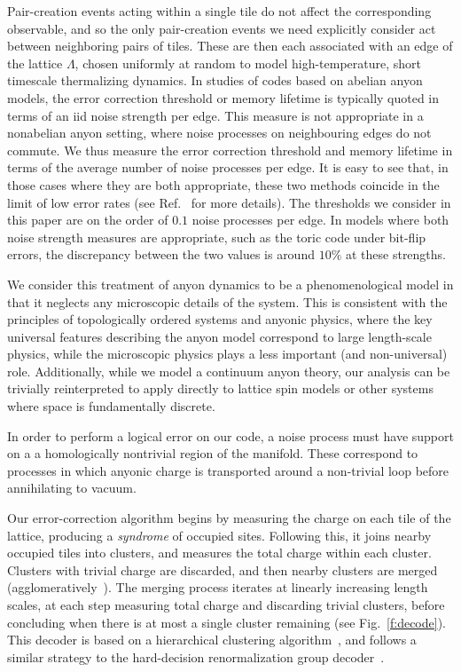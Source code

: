 \documentclass[aps, prl, letterpaper, twocolumn, superscriptaddress, notitlepage, 10pt]{revtex4-1}
\newcommand{\Fref}[1]{Fig.~\ref{#1}}
\begin{document}
Pair-creation events acting within a single tile do not affect the corresponding observable, and so the only pair-creation events we need explicitly consider act between neighboring pairs of tiles. These are then each associated with an edge of the lattice $\Lambda$, chosen 
uniformly at random to model high-temperature, short timescale thermalizing dynamics.
In studies of codes based on abelian anyon models, the error correction threshold or memory lifetime is typically quoted in terms of an iid noise strength per edge. This measure is not appropriate in a nonabelian anyon setting, where noise processes on neighbouring edges do not commute. We thus measure the error correction threshold and memory lifetime in terms of the average number of noise processes per edge. 
It is easy to see that, in those cases where they are both appropriate, these two methods coincide in the limit of low error rates (see Ref.~\cite{Brell2013} for more details). The thresholds we consider in this paper are on the order of $0.1$ noise processes per edge. In models where both noise strength measures are appropriate, such as the toric code under bit-flip errors, the discrepancy between the two values is around $10\%$ at these strengths.

We consider this treatment of anyon dynamics to be a phenomenological model in that
it neglects any microscopic details of the system.
This is consistent with the principles of topologically 
ordered systems and anyonic physics, where the key universal features describing the 
anyon model correspond to large length-scale physics, while the microscopic physics plays 
a less important (and non-universal) role.
Additionally, while we model a continuum anyon theory, our analysis can be trivially reinterpreted to apply directly to lattice spin models or other systems where space is fundamentally discrete.

In order to perform a logical error on our code, a noise process must have support on a 
a homologically nontrivial region of the manifold.
These correspond to processes in which anyonic charge is transported around a non-trivial loop before 
annihilating to vacuum.

Our error-correction algorithm begins by measuring the charge on 
each tile of the lattice, producing a \emph{syndrome} 
of occupied sites. Following this, it joins nearby occupied tiles into clusters, and measures the total charge within each cluster.
Clusters with trivial charge are discarded, and then nearby clusters are merged (agglomeratively~\cite{Hastie2009}).
The merging process iterates at linearly increasing length scales, at each step measuring total charge and discarding trivial clusters, before concluding when 
there is at most a single cluster remaining (see \Fref{f:decode}).
This decoder is based on a hierarchical clustering algorithm~\cite{Hastie2009, Wootton2015b},
and follows a similar strategy to the hard-decision renormalization group decoder~\cite{Bravyi2011}. 
\end{document}

